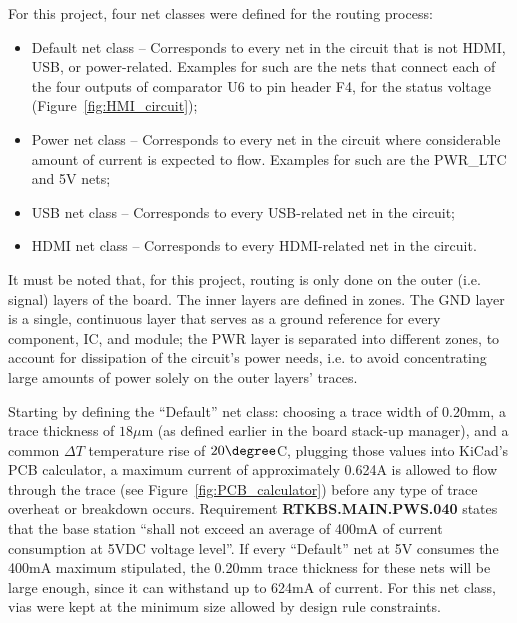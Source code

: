 For this project, four net classes were defined for the routing process:

\begin{itemize}
	\item Default net class -- Corresponds to every net in the circuit that is not HDMI, USB, or power-related. Examples for such are the nets that connect each of the four outputs of comparator U6 to pin header F4, for the status voltage (Figure~\ref{fig:HMI_circuit});
	
	\item Power net class -- Corresponds to every net in the circuit where considerable amount of current is expected to flow. Examples for such are the PWR\_LTC and 5V nets;
	
	\item USB net class -- Corresponds to every USB-related net in the circuit;
	
	\item HDMI net class -- Corresponds to every HDMI-related net in the circuit.
\end{itemize}

It must be noted that, for this project, routing is only done on the outer (i.e. signal) layers of the board. The inner layers are defined in zones. The GND layer is a single, continuous layer that serves as a ground reference for every component, IC, and module; the PWR layer is separated into different zones, to account for dissipation of the circuit's power needs, i.e. to avoid concentrating large amounts of power solely on the outer layers' traces.


Starting by defining the ``Default'' net class: choosing a trace width of 0.20mm, a trace thickness of $18 \mu$m (as defined earlier in the board stack-up manager), and a common $\Delta T$ temperature rise of $20 \degree$C, plugging those values into KiCad's PCB calculator, a maximum current of approximately 0.624A is allowed to flow through the trace (see Figure~\ref{fig:PCB_calculator}) before any type of trace overheat or breakdown occurs. Requirement \textbf{RTKBS.MAIN.PWS.040} states that the base station ``shall not exceed an average of 400mA of current consumption at 5VDC voltage level''. If every ``Default'' net at 5V consumes the 400mA maximum stipulated, the 0.20mm trace thickness for these nets will be large enough, since it can withstand up to 624mA of current. For this net class, vias were kept at the minimum size allowed by design rule constraints.

